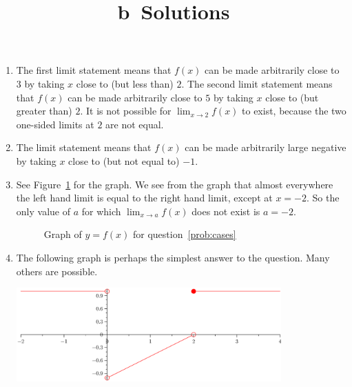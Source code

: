 \documentclass{article}
\title{\commonPSTitleZeroOneFive b\ Solutions}
\author{\commonAuthor}
\date{\commonDateZeroOneFive}
\newcommand{\ds}{\displaystyle}
\begin{document}
\maketitle
\begin{enumerate}
\item %
  The first limit statement means that $f(x)$ can be made arbitrarily close
  to $3$ by taking $x$ close to (but less than) $2$.  The second
  limit statement means that $f(x)$ can be made arbitrarily close to
  $5$ by taking $x$ close to (but greater than) $2$.  It is not
  possible for $\ds \lim_{x\to 2} f(x)$ to exist, because the two
  one-sided limits at $2$ are not equal.
\item %
  The limit statement means that $f(x)$ can be made arbitrarily large
  negative by taking $x$ close to (but not equal to) $-1$.
\item\label{prob:cases} %
  See Figure~\ref{fig:cases} for the graph.  We see from the graph
  that almost everywhere the left hand limit is equal to the right
  hand limit, except at $x=-2$.  So the only value of $a$ for which
  $\ds \lim_{x\to a} f(x)$ does not exist is $a=-2$.
  \begin{figure}[htbp]
    \centering
    \caption{Graph of $y=f(x)$ for question~\ref{prob:cases}}
    \label{fig:cases}
  \end{figure}
\item %
  The following graph is perhaps the simplest answer to the question.
  Many others are possible.
  \begin{center}
    \includegraphics[width=0.8\textwidth]{ps01q3.eps}

\end{center}
\end{enumerate}
\end{document}
